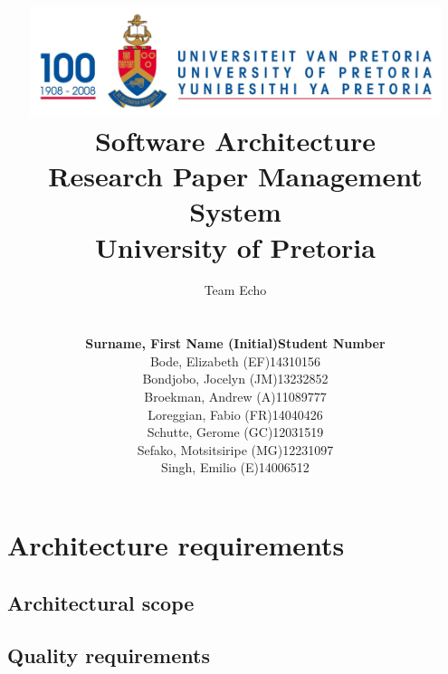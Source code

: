 \documentclass[a4paper,10pt]{article}
\title{\includegraphics[width=12cm]{Eeufeeslogo.jpg} \\
       Software Architecture \\
       Research Paper Management System \\
       \vspace{0.5cm}
       University of Pretoria \\
       \vspace{1.0cm}
       }
\date{}
\author{Team Echo\\
	\vspace{0.5cm} \\
	\begin{tabu} to \textwidth { X[l] X[l]}
		\hline
		\textbf{Surname, First Name (Initial)}	& \textbf{Student Number}	\\ \hline \hline
		Bode, Elizabeth (EF)			& 14310156		\\ \hline
		Bondjobo, Jocelyn (JM)		& 13232852		\\ \hline
		Broekman, Andrew (A)		& 11089777		\\ \hline
		Loreggian, Fabio (FR)			& 14040426		\\ \hline
		Schutte, Gerome (GC)		& 12031519		\\ \hline
		Sefako, Motsitsiripe (MG)		& 12231097		\\ \hline
		Singh, Emilio (E)			& 14006512		\\ \hline
		\hline
	\end{tabu}}
\begin{document}
\maketitle
\thispagestyle{empty}
\clearpage

\newpage
{}
\thispagestyle{empty}
\tableofcontents
\clearpage

\newpage
{}

\section{Architecture requirements}
\subsection{Architectural scope}
\subsection{Quality requirements}
\end{document}
